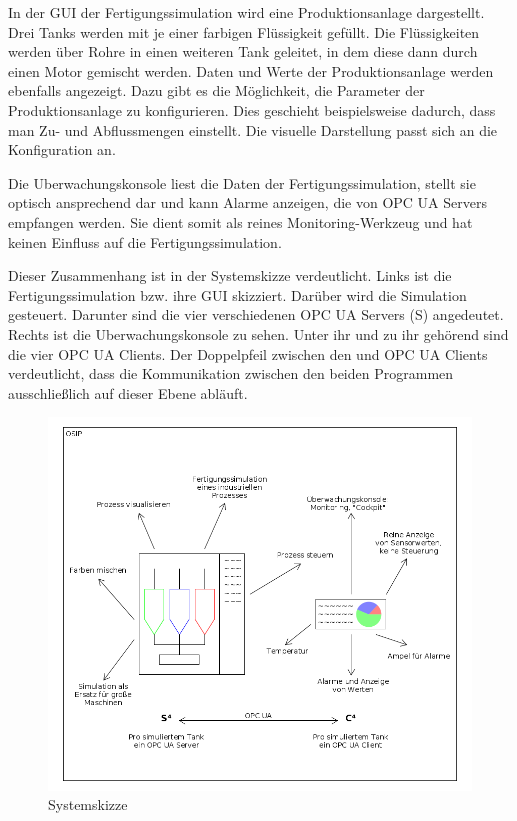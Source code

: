 \documentclass[parskip=full]{scrartcl}
\begin{document}
In der GUI der \gls{Fertigungssimulation} wird eine \gls{Produktionsanlage} dargestellt.
Drei Tanks werden mit je einer farbigen Flüssigkeit gefüllt. Die Flüssigkeiten werden über Rohre in einen weiteren Tank geleitet,
in dem diese dann durch einen Motor gemischt werden. Daten und Werte der \gls{Produktionsanlage} werden ebenfalls angezeigt.
Dazu gibt es die Möglichkeit, die Parameter der \gls{Produktionsanlage} zu konfigurieren. Dies geschieht beispielsweise dadurch, dass man
Zu- und Abflussmengen einstellt. Die visuelle Darstellung passt sich an die Konfiguration an.

Die \gls{Uberwachungskonsole} liest die Daten der \gls{Fertigungssimulation}, stellt sie optisch ansprechend dar und kann Alarme
anzeigen, die von \glspl{OPC UA Server} empfangen werden. Sie dient somit als reines Monitoring-Werkzeug
und hat keinen Einfluss auf die \gls{Fertigungssimulation}.

Dieser Zusammenhang ist in der Systemskizze verdeutlicht. Links ist die \gls{Fertigungssimulation} bzw. ihre \gls{GUI} skizziert.
Dar\"uber wird die Simulation gesteuert. Darunter sind die vier verschiedenen \glspl{OPC UA Server} (S) angedeutet.
Rechts ist die \gls{Uberwachungskonsole} zu sehen. Unter ihr und zu ihr geh\"orend sind die vier \glspl{OPC UA Client}.
Der Doppelpfeil zwischen den  und \glspl{OPC UA Client} verdeutlicht, dass die Kommunikation
zwischen den beiden Programmen ausschließlich auf dieser Ebene abl\"auft.

\begin{figure}[H]
  \centering
  \includegraphics[scale=0.5]{../system-sketch.png}
  \caption{Systemskizze}
\end{figure}
\end{document}
